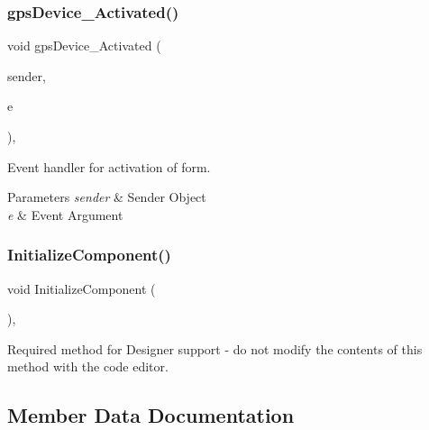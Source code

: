 \subsubsection{\texorpdfstring{gps\+Device\+\_\+\+Activated()}{gpsDevice\_Activated()}}
{\footnotesize\ttfamily void gps\+Device\+\_\+\+Activated (\begin{DoxyParamCaption}\item[{object}]{sender,  }\item[{Event\+Args}]{e }\end{DoxyParamCaption})\hspace{0.3cm}{\ttfamily [inline]}, {\ttfamily [private]}}



Event handler for activation of form. 


\begin{DoxyParams}{Parameters}
{\em sender} & Sender Object\\
\hline
{\em e} & Event Argument\\
\hline
\end{DoxyParams}
\mbox{\label{classWildlifeTrackingApp_1_1GPSDevice_a6405d5db675d5338663195a4d12b4c9f}} 
\subsubsection{\texorpdfstring{Initialize\+Component()}{InitializeComponent()}}
{\footnotesize\ttfamily void Initialize\+Component (\begin{DoxyParamCaption}{ }\end{DoxyParamCaption})\hspace{0.3cm}{\ttfamily [inline]}, {\ttfamily [private]}}



Required method for Designer support -\/ do not modify the contents of this method with the code editor. 



\subsection{Member Data Documentation}
\mbox{\label{classWildlifeTrackingApp_1_1GPSDevice_a7f1dbd5813451728f923cb88a3469cb6}} 

